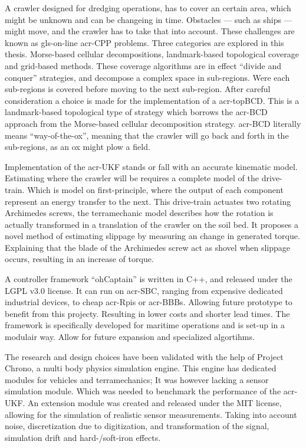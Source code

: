 A crawler designed for dredging operations, has to cover an certain area, which might be unknown and can be changeing
in time. Obstacles --- such as ships --- might move, and the crawler has to take that into account. These challenges 
are known as \gls{gls-on-line} \gls{acr-CPP} problems. Three categories are explored in this thesis. Morse-based 
cellular decompositions, landmark-based topological coverage and grid-based methods. These coverage algorithms are in
effect ``divide and conquer'' strategies, and decompose a complex space in sub-regions. Were each sub-regions is 
covered before moving to the next sub-region. After careful consideration a choice is made for the implementation of
a \gls{acr-topBCD}. This is a landmark-based topological type of strategy which borrows the \gls{acr-BCD} approach from 
the Morse-based cellular decomposition strategy. \gls{acr-BCD} literally means ``way-of-the-ox'', meaning that the 
crawler will go back and forth in the sub-regions, as an ox might plow a field.

Implementation of the \gls{acr-UKF} stands or fall with an accurate kinematic model. Estimating where the crawler 
will be requires a complete model of the drive-train. Which is model on first-principle, where the output of each 
component represent an energy transfer to the next. This drive-train actuates two rotating Archimedes screws, the 
terramechanic model describes how the rotation is actually transformed in a translation of the crawler on the soil 
bed. It proposes a novel method of estimating slippage by measuring an change in generated torque. Explaining that 
the blade of the Archimedes screw act as shovel when slippage occurs, resulting in an increase of torque.

A controller framework ``ohCaptain'' is written in C++, and released under the LGPL v3.0 license. It can run on 
\gls{acr-SBC}, ranging from expensive dedicated industrial devices, to cheap \glspl{acr-Rpi} or \glspl{acr-BBB}. 
Allowing future prototype to benefit from this projecty. Resulting in lower costs and shorter lead times. The 
framework is specifically developed for maritime operations and is set-up in a modulair way. Allow for future 
expansion and specialized algortihms.

The research and design choices have been validated with the help of Project Chrono, a multi body physics simulation 
engine. This engine has dedicated modules for vehicles and terramechanics; It was however lacking a sensor simulation
module. Which was needed to benchmark the performance of the \gls{acr-UKF}. An extension module was created and 
released under the MIT license, allowing for the simulation of realistic sensor measurements. Taking into account 
noise, discretization due to digitization, and transformation of the signal, simulation drift and hard-/soft-iron 
effects.

